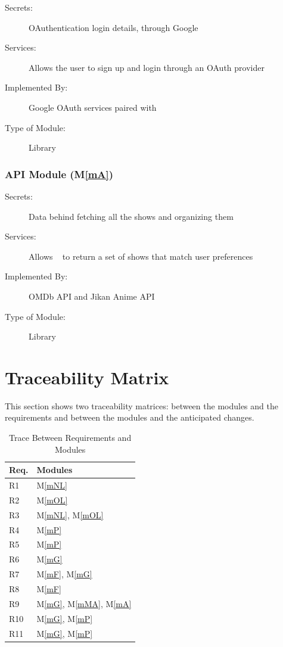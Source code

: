 \documentclass[12pt, titlepage]{article}
\newcommand{\mref}[1]{M\ref{#1}}
\begin{document}
\begin{description}
\item[Secrets:] OAuthentication login details, through Google
\item[Services:] Allows the user to sign up and login through an OAuth provider
\item[Implemented By:] Google OAuth services paired with \progname
\item[Type of Module:] Library
\end{description}

\subsubsection{API Module (\mref{mA})}

\begin{description}
\item[Secrets:] Data behind fetching all the shows and organizing them
\item[Services:] Allows \progname ~ to return a set of shows that match user preferences
\item[Implemented By:] OMDb API and Jikan Anime API
\item[Type of Module:] Library
\end{description}

\section{Traceability Matrix} \label{SecTM}

This section shows two traceability matrices: between the modules and the
requirements and between the modules and the anticipated changes.

\begin{table}[H]
\centering
\begin{tabular}{p{} p{}}
\toprule
\textbf{Req.} & \textbf{Modules}\\
\midrule
R1 & \mref{mNL}\\
R2 & \mref{mOL}\\
R3 & \mref{mNL}, \mref{mOL}\\
R4 & \mref{mP}\\
R5 & \mref{mP}\\
R6 & \mref{mG}\\
R7 & \mref{mF}, \mref{mG}\\
R8 & \mref{mF}\\
R9 & \mref{mG}, \mref{mMA}, \mref{mA}\\
R10 & \mref{mG}, \mref{mP}\\
R11 & \mref{mG}, \mref{mP}\\
\bottomrule
\end{tabular}
\caption{Trace Between Requirements and Modules}
\label{TblRT}
\end{table}
\end{document}
